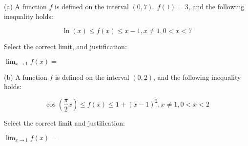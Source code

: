\documentclass{ximera}
\author{Tom Dinitz and Nela Lakos}
\begin{document}
\begin{exercise}

(a) A function $f$ is defined on the interval $(0,7)$. $f(1)=3$, and the following inequality holds:

$$\ln(x)\leq f(x) \leq x-1, x\neq 1, 0<x<7$$

Select the correct limit, and justification:

$\lim_{x\to 1} f(x)=$ 
\begin{prompt}
\begin{multipleChoice}
\end{multipleChoice}
\end{prompt}

(b) A function $f$ is defined on the interval $(0,2)$, and the following inequality holds:

$$\cos(\frac{\pi}{2}x)\leq f(x) \leq 1+(x-1)^2, x\neq 1, 0<x<2$$

Select the correct limit and justification:

$\lim_{x\to 1} f(x)=$
\begin{prompt}
\begin{multipleChoice}
\end{multipleChoice}                                                                            
\end{prompt}      

\end{exercise}
\end{document}
